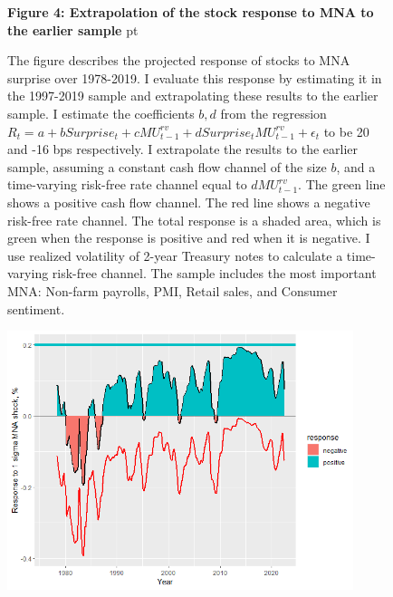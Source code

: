 \documentclass[12pt]{article}
\begin{document}
\begin{figure}[h!]
\textbf{Figure 4: Extrapolation of the stock response to MNA to the earlier sample}
 pt
\begin{flushleft}
{The figure describes the projected response of stocks to MNA surprise over 1978-2019.
I evaluate this response by estimating it in the 1997-2019 sample and extrapolating these results to the earlier sample. I estimate the coefficients $b, d$ from the regression $R_t = a + b Surprise_t + c MU^{rv}_{t-1} + d Surprise_t MU^{rv}_{t-1} + \epsilon_t$ to be 20 and -16 bps respectively. I extrapolate the results to the earlier sample, assuming a constant cash flow channel of the size $b$, and a time-varying risk-free rate channel equal to $d MU^{rv}_{t-1}$. The green line shows a positive cash flow channel. The red line shows a negative risk-free rate channel. The total response is a shaded area, which is green when the response is positive and red when it is negative. I use realized volatility of 2-year Treasury notes to calculate a time-varying risk-free channel. The sample includes the most important MNA: Non-farm payrolls, PMI, Retail sales, and Consumer sentiment.}
\end{flushleft}
\centering
\vspace{0.64cm}
\includegraphics[width=0.9\textwidth]{images/1980s_plot2.png}
\end{figure}
\end{document}
